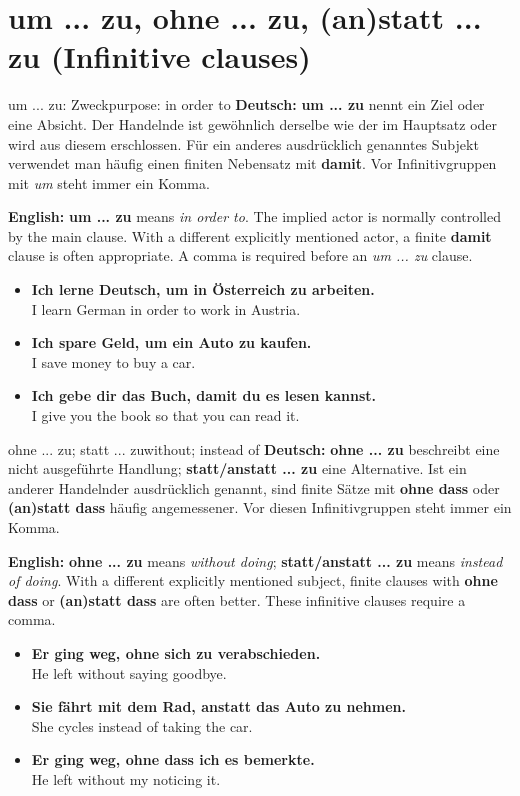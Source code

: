 \documentclass[a4paper,11pt]{article}
\newcommand{\GermanText}[1]{\textbf{Deutsch: }#1\par}
\newcommand{\EnglishText}[1]{{\small\color{SoftGray}\textbf{English: }#1\par}}
\newcommand{\ExampleItem}[2]{\item \textbf{#1}\\{\small\color{SoftGray}#2}}
\begin{document}
\section{um ... zu, ohne ... zu, (an)statt ... zu (Infinitive clauses)}
\begin{grammarentry}{um ... zu: Zweck}{purpose: in order to}
\GermanText{\textbf{um ... zu} nennt ein Ziel oder eine Absicht. Der Handelnde ist gewöhnlich derselbe wie der im Hauptsatz oder wird aus diesem erschlossen. Für ein anderes ausdrücklich genanntes Subjekt verwendet man häufig einen finiten Nebensatz mit \textbf{damit}. Vor Infinitivgruppen mit \emph{um} steht immer ein Komma.}
\EnglishText{\textbf{um ... zu} means \emph{in order to}. The implied actor is normally controlled by the main clause. With a different explicitly mentioned actor, a finite \textbf{damit} clause is often appropriate. A comma is required before an \emph{um ... zu} clause.}
\end{grammarentry}
\begin{exbox}
\begin{itemize}
\ExampleItem{Ich lerne Deutsch, um in Österreich zu arbeiten.}{I learn German in order to work in Austria.}
\ExampleItem{Ich spare Geld, um ein Auto zu kaufen.}{I save money to buy a car.}
\ExampleItem{Ich gebe dir das Buch, damit du es lesen kannst.}{I give you the book so that you can read it.}
\end{itemize}
\end{exbox}
\begin{grammarentry}{ohne ... zu; statt ... zu}{without; instead of}
\GermanText{\textbf{ohne ... zu} beschreibt eine nicht ausgeführte Handlung; \textbf{statt/anstatt ... zu} eine Alternative. Ist ein anderer Handelnder ausdrücklich genannt, sind finite Sätze mit \textbf{ohne dass} oder \textbf{(an)statt dass} häufig angemessener. Vor diesen Infinitivgruppen steht immer ein Komma.}
\EnglishText{\textbf{ohne ... zu} means \emph{without doing}; \textbf{statt/anstatt ... zu} means \emph{instead of doing}. With a different explicitly mentioned subject, finite clauses with \textbf{ohne dass} or \textbf{(an)statt dass} are often better. These infinitive clauses require a comma.}
\end{grammarentry}
\begin{exbox}
\begin{itemize}
\ExampleItem{Er ging weg, ohne sich zu verabschieden.}{He left without saying goodbye.}
\ExampleItem{Sie fährt mit dem Rad, anstatt das Auto zu nehmen.}{She cycles instead of taking the car.}
\ExampleItem{Er ging weg, ohne dass ich es bemerkte.}{He left without my noticing it.}
\end{itemize}
\end{exbox}
\end{document}
